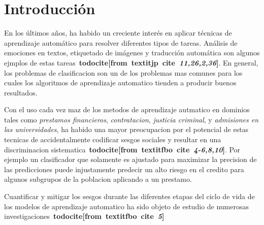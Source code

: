 \chapter*{Introducción}\label{chapter:introduction}

\newcommand{\todocite}[2]{\textbf{todocite[from~textit{#1}~cite~\textit{#2}]}}



En los últimos años, ha habido un creciente interés en aplicar técnicas de aprendizaje automático para resolver diferentes tipos de tareas.
Análisis de emociones en textos, etiquetado de imágenes y traducción automática son algunos ejmplos de estas tareas~\todocite{jp}{11,26,2,36}.
En general, los problemas de clasificacion son un de los problemas mas comunes para los cuales los algoritmos de aprendizaje automatico tienden a producir buenos resultados.


Con el uso cada vez maz de los metodos de aprendizaje autmatico en dominios tales como \emph{prestamos financieros}, \emph{contratacion}, \emph{justicia criminal}, y \emph{admisiones en las universidades}, ha habido una mayor preocupacion por el potencial de estas tecnicas de accidentalmente codificar sesgos sociales y resultar en una discriminacion sistematica~\todocite{fbo}{4-6,8,10}.
Por ejemplo un clasificador que solamente es ajustado para maximizar la precision de las predicciones puede injustamente predecir un alto riesgo en el credito para algunos subgrupos de la poblacion aplicando a un prestamo.



Cuantificar y mitigar los sesgos durante las diferentes etapas del ciclo de vida de los modelos de aprendizaje automatico ha sido objeto de estudio de numerosas investigaciones~\todocite{fbo}{5}



